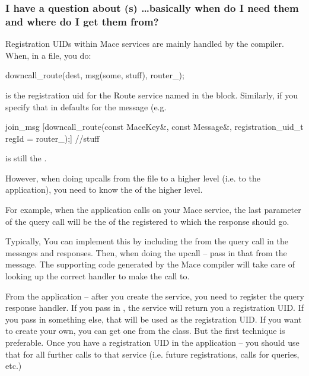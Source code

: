 \subsubsection*{I have a question about (s) 
\ldots basically when do I need them and where do I get them from?}


Registration UIDs within Mace services are mainly handled by the
compiler.  When, in a \mac file, you do:

\begin{programlisting}
downcall_route(dest, msg(some, stuff), router_);
\end{programlisting}

 is the registration uid for the Route service 
named  in the  block.
Similarly, if you specify that in defaults for the message (e.g.
  
\begin{programlisting}
join_msg [downcall_route(const MaceKey&, const Message&, registration_uid_t regId = router_);] {
   //stuff
}
\end{programlisting}

 is still the .

However, when doing upcalls from the \mac file to a higher level (i.e. to the
application), you need to know the  of the
higher level.

For example, when the application calls  on your Mace
service, the last parameter of the query call will be the
 of the registered
 to which the response should go.

Typically, You can implement this by including the
 from the query call in the messages and
responses.  Then, when doing the upcall -- pass in that
 from the message.  The supporting code
generated by the Mace compiler will take care of looking up the correct handler
to make the call to.

From the application -- after you create the service, you need to
register the query response handler.  If you pass in , the
service will return you a registration UID.  If you pass in something
else, that will be used as the registration UID.  If you want to
create your own, you can get one from the  class.  But the
first technique is preferable.  Once you have a registration UID in
the application -- you should use that for all further calls to that
service (i.e. future registrations, calls for queries, etc.)

